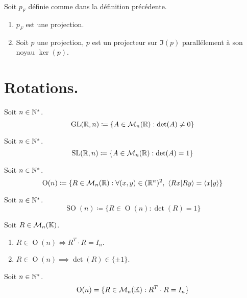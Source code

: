\begin{proposition}
    Soit $p_F$ définie comme dans la définition précédente.
    \begin{enumerate}
        \item $p_F$ est une projection.
        \item Soit $p$ une projection, $p$ est un projecteur sur $\Im(p)$ parallélement à son noyau $\ker(p)$.
    \end{enumerate}
\end{proposition}

\section{Rotations.}
\begin{definition}
	Soit $n \in \mathbb{N}^*$.
    \[ \operatorname{GL}(\mathbb{R}, n) \coloneqq \{ A \in \mathcal{M}_n(\mathbb{R}) : \det(A) \neq 0 \} \]
\end{definition}

\begin{definition}
	Soit $n \in \mathbb{N}^*$.
    \[ \operatorname{SL}(\mathbb{R}, n) \coloneqq \{ A \in \mathcal{M}_n(\mathbb{R}) : \det(A) = 1 \} \]
\end{definition}

\begin{definition}
	Soit $n \in \mathbb{N}^*$.
    \[ \operatorname{O}(n) \coloneqq \{ R \in \mathcal{M}_n(\mathbb{R}) : \forall (x, y) \in (\mathbb{R}^n)^2,\ \langle Rx|Ry \rangle = \langle x|y \rangle \} \]
\end{definition}

\begin{definition}
    Soit $n \in \mathbb{N}^*$.
    \[ \operatorname{SO}(n) \coloneqq \{ R \in \operatorname{O}(n) : \det(R) = 1 \} \]
\end{definition}

\begin{proposition}
	Soit $R \in \mathcal{M}_n(\mathbb{K})$.
    \begin{enumerate}
        \item $R \in \operatorname{O}(n) \iff R^T \cdot R = I_n$.
        \item $R \in \operatorname{O}(n) \implies \det(R) \in \{ \pm 1 \}$.
    \end{enumerate}
\end{proposition}

\begin{corollary}
	Soit $n \in \mathbb{N}^*$.
    \[ \operatorname{O}(n) = \{ R \in \mathcal{M}_n(\mathbb{K}) : R^T \cdot R = I_n \} \]
\end{corollary}

